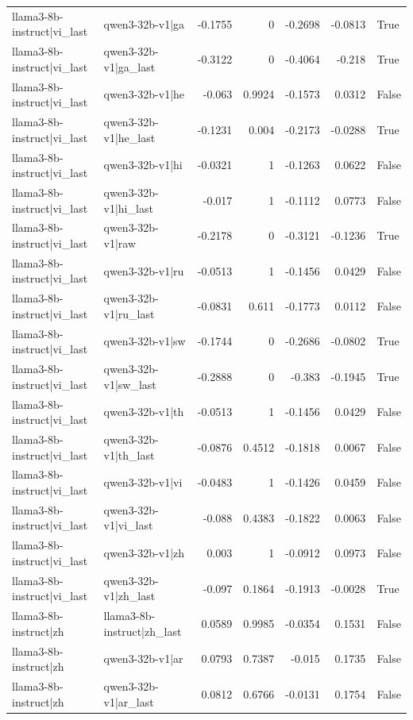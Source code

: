 \begin{table}
\begin{tabular}{l l r r r r l}
llama3-8b-instruct|vi_last & qwen3-32b-v1|ga & -0.1755 & 0 & -0.2698 & -0.0813 & True \\
llama3-8b-instruct|vi_last & qwen3-32b-v1|ga_last & -0.3122 & 0 & -0.4064 & -0.218 & True \\
llama3-8b-instruct|vi_last & qwen3-32b-v1|he & -0.063 & 0.9924 & -0.1573 & 0.0312 & False \\
llama3-8b-instruct|vi_last & qwen3-32b-v1|he_last & -0.1231 & 0.004 & -0.2173 & -0.0288 & True \\
llama3-8b-instruct|vi_last & qwen3-32b-v1|hi & -0.0321 & 1 & -0.1263 & 0.0622 & False \\
llama3-8b-instruct|vi_last & qwen3-32b-v1|hi_last & -0.017 & 1 & -0.1112 & 0.0773 & False \\
llama3-8b-instruct|vi_last & qwen3-32b-v1|raw & -0.2178 & 0 & -0.3121 & -0.1236 & True \\
llama3-8b-instruct|vi_last & qwen3-32b-v1|ru & -0.0513 & 1 & -0.1456 & 0.0429 & False \\
llama3-8b-instruct|vi_last & qwen3-32b-v1|ru_last & -0.0831 & 0.611 & -0.1773 & 0.0112 & False \\
llama3-8b-instruct|vi_last & qwen3-32b-v1|sw & -0.1744 & 0 & -0.2686 & -0.0802 & True \\
llama3-8b-instruct|vi_last & qwen3-32b-v1|sw_last & -0.2888 & 0 & -0.383 & -0.1945 & True \\
llama3-8b-instruct|vi_last & qwen3-32b-v1|th & -0.0513 & 1 & -0.1456 & 0.0429 & False \\
llama3-8b-instruct|vi_last & qwen3-32b-v1|th_last & -0.0876 & 0.4512 & -0.1818 & 0.0067 & False \\
llama3-8b-instruct|vi_last & qwen3-32b-v1|vi & -0.0483 & 1 & -0.1426 & 0.0459 & False \\
llama3-8b-instruct|vi_last & qwen3-32b-v1|vi_last & -0.088 & 0.4383 & -0.1822 & 0.0063 & False \\
llama3-8b-instruct|vi_last & qwen3-32b-v1|zh & 0.003 & 1 & -0.0912 & 0.0973 & False \\
llama3-8b-instruct|vi_last & qwen3-32b-v1|zh_last & -0.097 & 0.1864 & -0.1913 & -0.0028 & True \\
llama3-8b-instruct|zh & llama3-8b-instruct|zh_last & 0.0589 & 0.9985 & -0.0354 & 0.1531 & False \\
llama3-8b-instruct|zh & qwen3-32b-v1|ar & 0.0793 & 0.7387 & -0.015 & 0.1735 & False \\
llama3-8b-instruct|zh & qwen3-32b-v1|ar_last & 0.0812 & 0.6766 & -0.0131 & 0.1754 & False \\

\end{tabular}
\end{table}
